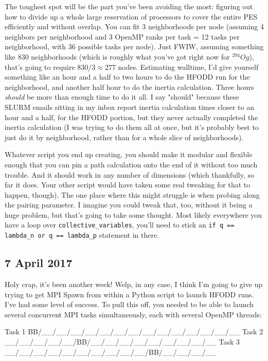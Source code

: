 The toughest spot will be the part you've been avoiding the most: figuring out how to divide up a whole large reservation of processors to cover the entire PES efficiently and without overlap. You can fit 3 neighborhoods per node (assuming 4 neighbors per neighborhood and 3 OpenMP ranks per task = 12 tasks per neighborhood, with 36 possible tasks per node). Just FWIW, assuming something like 830 neighborhoods (which is roughly what you've got right now for $^{294}Og$), that's going to require $830/3 \approx 277$ nodes. Estimating walltime, I'd give yourself something like an hour and a half to two hours to do the HFODD run for the neighborhood, and another half hour to do the inertia calculation. Three hours \textit{should} be more than enough time to do it all. I say "should" because these SLURM emails sitting in my inbox report inertia calculation times closer to an hour and a half, for the HFODD portion, but they never actually completed the inertia calculation (I was trying to do them all at once, but it's probably best to just do it by neighborhood, rather than for a whole slice of neighborhoods).

Whatever script you end up creating, you should make it modular and flexible enough that you can pin a path calculation onto the end of it without too much trouble. And it should work in any number of dimensions (which thankfully, so far it does. Your other script would have taken some real tweaking for that to happen, though). The one place where this might struggle is when probing along the pairing parameter. I imagine you could tweak that, too, without it being a huge problem, but that's going to take some thought. Most likely everywhere you have a loop over \texttt{collective\_variables}, you'll need to stick an \texttt{if q == lambda\_n or q == lambda\_p} statement in there.

\subsection*{7 April 2017}
Holy crap, it's been another week! Welp, in any case, I think I'm going to give up trying to get MPI Spawn from within a Python script to launch HFODD runs. I've had some level of success. To pull this off, you needed to be able to launch several concurrent MPI tasks simultaneously, each with several OpenMP threads:

\begin{verbatim*}
Task 1 BB/__/__/__/__/__/__/__/__/__/__/__/__/__/__
Task 2 __/__/__/__/__/BB/__/__/__/__/__/__/__/__/__
Task 3 __/__/__/__/__/__/__/__/__/__/BB/__/__/__/__
\end{verbatim*}

